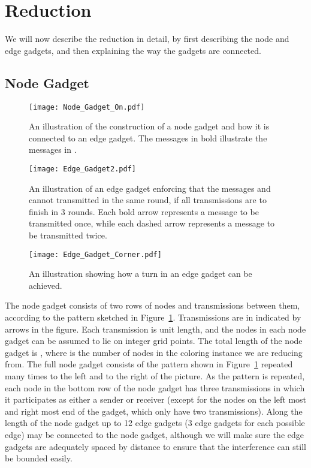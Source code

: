 \documentclass{article}
\begin{document}
\section{Reduction}
\label{sec:mainresult}
We will now describe the reduction in detail, by first describing the node and edge gadgets, and then explaining the way the gadgets are connected.


\subsection{Node Gadget}

\begin{figure}
\begin{center}
\texttt{[image: Node\_Gadget\_On.pdf]}
\end{center}
\caption[Node gadget]{An illustration of the construction of a node gadget and how it is connected to an edge gadget.  The messages in bold illustrate the messages in .}
\label{fig:nodegadgeton}
\end{figure}
\begin{figure}
\begin{center}
\texttt{[image: Edge\_Gadget2.pdf]}
\end{center}
\caption[Edge gadget]{An illustration of an edge gadget enforcing that the messages  and  cannot transmitted in the same round, if all transmissions are to finish in 3 rounds. Each bold arrow represents a message to be transmitted once, while each dashed arrow represents a message to be transmitted twice.}
\label{fig:edgegadget}
\end{figure}
\begin{figure}[t!]
\begin{center}
\texttt{[image: Edge\_Gadget\_Corner.pdf]}
\end{center}
\caption[Edge gadget]{An illustration showing how a turn in an edge gadget can be achieved.}
\label{fig:edgeturn}
\end{figure}

The node gadget consists of two rows of nodes and transmissions between them, according to the pattern sketched in Figure~\ref{fig:nodegadgeton}.  Transmissions are in indicated by arrows in the figure.  Each transmission is unit length, and the nodes in each node gadget can be assumed to lie on integer grid points. The total length of the node gadget is , where  is the number of nodes in the coloring instance we are reducing from.  The full node gadget consists of the pattern shown in Figure~\ref{fig:nodegadgeton} repeated many times to the left and to the right of the picture.  As the pattern is repeated, each node in the bottom row of the node gadget has three transmissions in which it participates as either a sender or receiver (except for the nodes on the left most and right most end of the gadget, which only have two transmissions).  Along the length of the node gadget up to 12 edge gadgets (3 edge gadgets for each possible edge) may be connected to the node gadget, although we will make sure the edge gadgets are adequately spaced by distance  to ensure that the interference can still be bounded easily.
\end{document}
